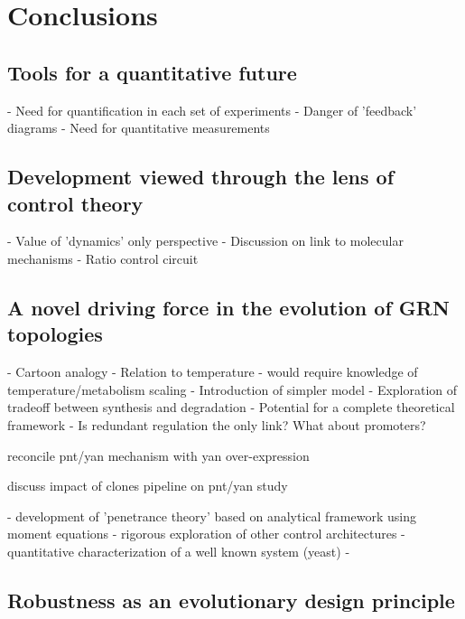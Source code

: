 \chapter{Conclusions}
\label{ch:conclusion}


\section{ Tools for a quantitative future }

- Need for quantification in each set of experiments
- Danger of 'feedback' diagrams
- Need for quantitative measurements


\section{ Development viewed through the lens of control theory }

- Value of 'dynamics' only perspective
- Discussion on link to molecular mechanisms
- Ratio control circuit


\section{ A novel driving force in the evolution of GRN topologies }

- Cartoon analogy
- Relation to temperature - would require knowledge of temperature/metabolism scaling
- Introduction of simpler model
- Exploration of tradeoff between synthesis and degradation
- Potential for a complete theoretical framework
- Is redundant regulation the only link? What about promoters?







reconcile pnt/yan mechanism with yan over-expression

discuss impact of clones pipeline on pnt/yan study


- development of 'penetrance theory' based on analytical framework using moment equations
- rigorous exploration of other control architectures
- quantitative characterization of a well known system (yeast)
- 


\section{Robustness as an evolutionary design principle}

